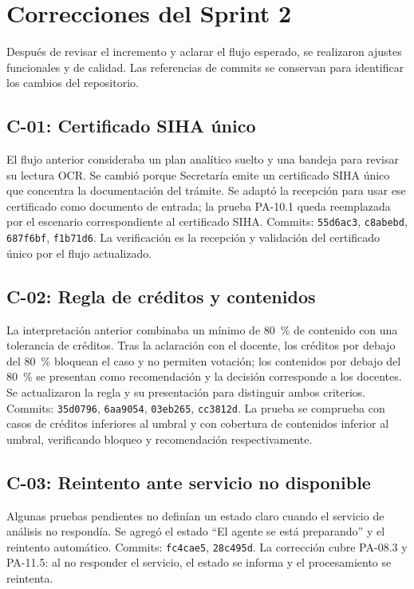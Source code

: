 \section{Correcciones del Sprint 2}\label{sec:correcciones}
Después de revisar el incremento y aclarar el flujo esperado, se realizaron ajustes funcionales y de calidad. Las referencias de commits se conservan para identificar los cambios del repositorio.

\subsection{C-01: Certificado SIHA único}
El flujo anterior consideraba un plan analítico suelto y una bandeja para revisar su lectura OCR. Se cambió porque Secretaría emite un certificado SIHA único que concentra la documentación del trámite. Se adaptó la recepción para usar ese certificado como documento de entrada; la prueba PA-10.1 queda reemplazada por el escenario correspondiente al certificado SIHA. Commits: \texttt{55d6ac3}, \texttt{c8abebd}, \texttt{687f6bf}, \texttt{f1b71d6}. La verificación es la recepción y validación del certificado único por el flujo actualizado.

\subsection{C-02: Regla de créditos y contenidos}
La interpretación anterior combinaba un mínimo de 80~\% de contenido con una tolerancia de créditos. Tras la aclaración con el docente, los créditos por debajo del 80~\% bloquean el caso y no permiten votación; los contenidos por debajo del 80~\% se presentan como recomendación y la decisión corresponde a los docentes. Se actualizaron la regla y su presentación para distinguir ambos criterios. Commits: \texttt{35d0796}, \texttt{6aa9054}, \texttt{03eb265}, \texttt{cc3812d}. La prueba se comprueba con casos de créditos inferiores al umbral y con cobertura de contenidos inferior al umbral, verificando bloqueo y recomendación respectivamente.

\subsection{C-03: Reintento ante servicio no disponible}
Algunas pruebas pendientes no definían un estado claro cuando el servicio de análisis no respondía. Se agregó el estado ``El agente se está preparando'' y el reintento automático. Commits: \texttt{fc4cae5}, \texttt{28c495d}. La corrección cubre PA-08.3 y PA-11.5: al no responder el servicio, el estado se informa y el procesamiento se reintenta.

